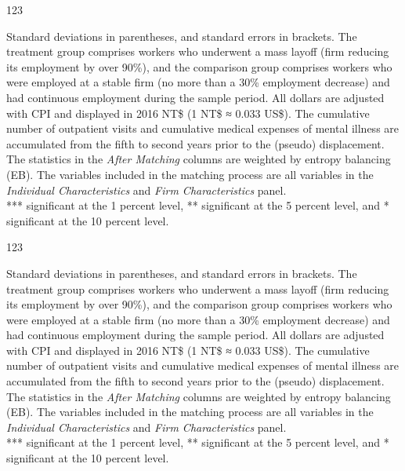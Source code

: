 \begin{table}[H]
    \caption{123}
    \center
    
\end{table}
\begin{singlespace}
    \begin{footnotesize}
     Standard deviations in parentheses, and standard errors in brackets. The treatment group comprises workers who underwent a mass layoff (firm reducing its employment by over 90\%), and the comparison group comprises workers who were employed at a stable firm (no more than a 30\% employment decrease) and had continuous employment during the sample period. All dollars are adjusted with CPI and displayed in 2016 NT\$ (1 NT\$ ≈ 0.033 US\$). The cumulative number of outpatient visits and cumulative medical expenses of mental illness are accumulated from the fifth to second years prior to the (pseudo) displacement. The statistics in the {\it After Matching} columns are weighted by entropy balancing (EB). The variables included in the matching process are all variables in the {\it Individual Characteristics} and {\it Firm Characteristics} panel. \\
    *** significant at the 1 percent level, ** significant at the 5 percent level, and * significant at the 10 percent level.
    \end{footnotesize}
\end{singlespace}

\begin{table}[H]
    \caption{123}
    \center
    
\end{table}
\begin{singlespace}
    \begin{footnotesize}
     Standard deviations in parentheses, and standard errors in brackets. The treatment group comprises workers who underwent a mass layoff (firm reducing its employment by over 90\%), and the comparison group comprises workers who were employed at a stable firm (no more than a 30\% employment decrease) and had continuous employment during the sample period. All dollars are adjusted with CPI and displayed in 2016 NT\$ (1 NT\$ ≈ 0.033 US\$). The cumulative number of outpatient visits and cumulative medical expenses of mental illness are accumulated from the fifth to second years prior to the (pseudo) displacement. The statistics in the {\it After Matching} columns are weighted by entropy balancing (EB). The variables included in the matching process are all variables in the {\it Individual Characteristics} and {\it Firm Characteristics} panel. \\
    *** significant at the 1 percent level, ** significant at the 5 percent level, and * significant at the 10 percent level.
    \end{footnotesize}
\end{singlespace}


